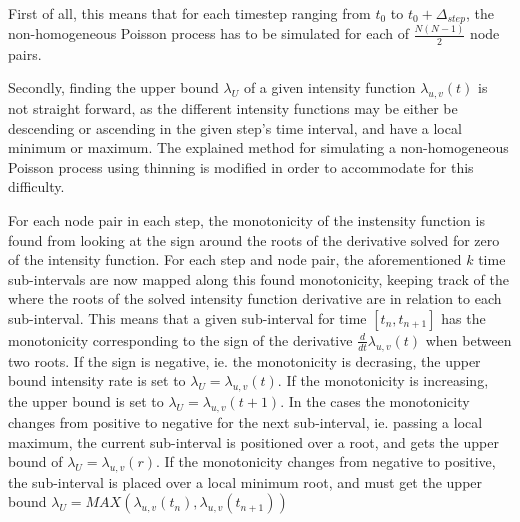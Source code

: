 First of all, this means that for each timestep ranging from $t_0$ to $t_0 + \Delta_{step}$, the non-homogeneous Poisson process has to be simulated for each of $\frac{N(N-1)}{2}$ node pairs.

Secondly, finding the upper bound $\lambda_U$ of a given intensity function $\lambda_{u,v}(t)$ is not straight forward, as the different intensity functions may be either be descending or ascending in the given step's time interval, and have a local minimum or maximum.
The explained method for simulating a non-homogeneous Poisson process using thinning is modified in order to accommodate for this difficulty.

For each node pair in each step, the monotonicity of the instensity function is found from looking at the sign around the roots of the derivative solved for zero of the intensity function.
For each step and node pair, the aforementioned $k$ time sub-intervals are now mapped along this found monotonicity, keeping track of the where the roots of the solved intensity function derivative are in relation to each sub-interval.
This means that a given sub-interval for time $[t_n,t_{n+1}]$ has the monotonicity corresponding to the sign of the derivative $\frac{d}{dt} \lambda_{u,v}(t)$ when between two roots.
If the sign is negative, ie. the monotonicity is decrasing, the upper bound intensity rate is set to $\lambda_U = \lambda_{u,v}(t)$.
If the monotonicity is increasing, the upper bound is set to $\lambda_U = \lambda_{u,v}(t+1)$.
In the cases the monotonicity changes from positive to negative for the next sub-interval, ie. passing a local maximum, the current sub-interval is positioned over a root, and gets the upper bound of $\lambda_U = \lambda_{u,v}(r)$.
If the monotonicity changes from negative to positive, the sub-interval is placed over a local minimum root, and must get the upper bound $\lambda_U = MAX(\lambda_{u,v}(t_n), \lambda_{u,v}(t_{n+1}))$
